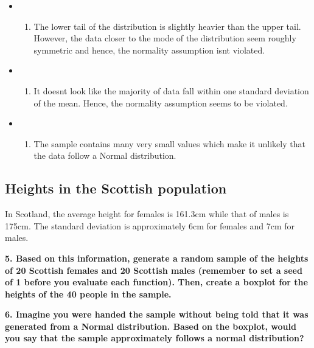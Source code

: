 \documentclass[
]{book}
\providecommand{\tightlist}{%
  \setlength{\itemsep}{0pt}\setlength{\parskip}{0pt}}
\begin{document}
\begin{itemize}
\item
  \begin{enumerate}
  \def\labelenumi{(\Alph{enumi})}
  \tightlist
  \item
    The lower tail of the distribution is slightly heavier than the upper tail. However, the data closer to the mode of the distribution seem roughly symmetric and hence, the normality assumption isn\textquotesingle t violated.\\
  \end{enumerate}
\item
  \begin{enumerate}
  \def\labelenumi{(\Alph{enumi})}
  \setcounter{enumi}{1}
  \tightlist
  \item
    It doesn\textquotesingle t look like the majority of data fall within one standard deviation of the mean. Hence, the normality assumption seems to be violated.\\
  \end{enumerate}
\item
  \begin{enumerate}
  \def\labelenumi{(\Alph{enumi})}
  \setcounter{enumi}{2}
  \tightlist
  \item
    The sample contains many very small values which make it unlikely that the data follow a Normal distribution.
  \end{enumerate}
\end{itemize}

\hypertarget{heights-in-the-scottish-population}{%
\subsection{Heights in the Scottish population}\label{heights-in-the-scottish-population}}

In Scotland, the average height for females is 161.3cm while that of males is 175cm. The standard deviation is approximately 6cm for females and 7cm for males.

\textbf{5. Based on this information, generate a random sample of the heights of 20 Scottish females and 20 Scottish males (remember to set a seed of 1 before you evaluate each function). Then, create a boxplot for the heights of the 40 people in the sample.}

\textbf{6. Imagine you were handed the sample without being told that it was generated from a Normal distribution. Based on the boxplot, would you say that the sample approximately follows a normal distribution?}
\end{document}
